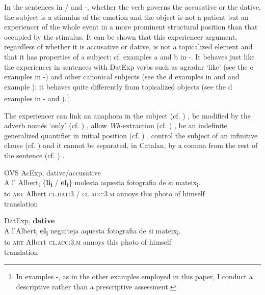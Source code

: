 \documentclass[output=paper,modfonts,nonflat,newtxmath]{langsci/langscibook}
\begin{document}
In the sentences in / and -, whether the verb governs the accusative or the dative, the subject is a stimulus of the emotion and the object is not a patient but an experiencer of the whole event in a more prominent structural position than that occupied by the stimulus. It can be shown that this experiencer argument, regardless of whether it is accusative or dative, is not a topicalized element and that it has properties of a subject: cf. examples {a} and {b} in -. It behaves just like the experiencer in sentences with DatExp verbs such as {agradar} ‘like’ (see the {c} examples in -) and other canonical subjects (see the {d} examples in  and  and example ): it behaves quite differently from topicalized objects (see the {d} examples in - and ).\footnote{In examples -, as in the other examples employed in this paper, I conduct a descriptive rather than a prescriptive assessment.}

The experiencer can link an anaphora in the subject (cf. \citealt{Demonte1989, EgurenFernandez2004}) , be modified by the adverb {només} ‘only’ (cf. \citealt{Cuervo1999}) , allow \textit{Wh-}extraction (cf. \citealt{BellettiRizzi1988}) , be an indefinite generalized quantifier in initial position (cf. \citealt{BellettiRizzi1988, Masullo1992, Cuervo1999}) , control the subject of an infinitive clause (cf. \citealt{Campos1999, Alsina2008})  and it cannot be separated, in Catalan, by a comma from the rest of the sentence (cf. \citealt{Ginebra2003, 2005}) .

\ea%
 \label{ex:royo:8}
 \ea OVS AcExp, {dative/accusative} \label{ex:royo:8a}\\
 \gll A l’ Albert\textsubscript{i} \{\textbf{li\textsubscript{i}} / \textbf{el\textsubscript{i}}\} molesta aquesta fotografia de si mateix\textsubscript{i}.\\
  to \textsc{art} Albert {\textsc{cl.dat:3}} / {\textsc{cl.acc:3.m}} annoys this photo of himself\\
 \glt translation
 
 \ex DatExp, \textbf{dative}\label{ex:royo:8b}\\
 \gll A l’Albert\textsubscript{i} \textbf{el\textsubscript{i}} neguiteja aquesta fotografia de si mateix\textsubscript{i}.\\
 to \textsc{art} Albert {\textsc{cl.acc:3.m}} annoys this photo of himself\\
 \glt translation
 
\end{document}
